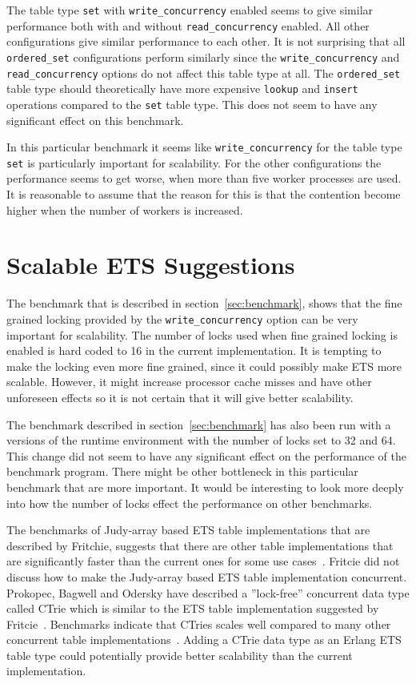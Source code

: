 \documentclass[aps,pre,preprint,nofootinbib]{revtex4}
\begin{document}
  The table type \verb|set| with \verb|write_concurrency| enabled seems to give similar performance both with and without \verb|read_concurrency| enabled.
  All other configurations give similar performance to each other.
  It is not surprising that all \verb|ordered_set| configurations perform similarly since the \verb|write_concurrency| and \verb|read_concurrency| options do not affect this table type at all.
  The \verb|ordered_set| table type should theoretically have more expensive \verb|lookup| and \verb|insert| operations compared to the \verb|set| table type.
  This does not seem to have any significant effect on this benchmark.
  
  In this particular benchmark it seems like \verb|write_concurrency| for the table type \verb|set| is particularly important for scalability.
  For the other configurations the performance seems to get worse, when more than five worker processes are used.
  It is reasonable to assume that the reason for this is that the contention become higher when the number of workers is increased.

  
  
\section{Scalable ETS Suggestions}

  The benchmark that is described in section~\ref{sec:benchmark}, shows that the fine grained locking provided by the \verb|write_concurrency| option can be very important for scalability.
  The number of locks used when fine grained locking is enabled is hard coded to 16 in the current implementation.
  It is tempting to make the locking even more fine grained, since it could possibly make ETS more scalable.
  However, it might increase processor cache misses and have other unforeseen effects so it is not certain that it will give better scalability. 
  
  The benchmark described in section~\ref{sec:benchmark} has also been run with a versions of the runtime environment with the number of locks set to 32 and 64.
  This change did not seem to have any significant effect on the performance of the benchmark program.
  There might be other bottleneck in this particular benchmark that are more important.
  It would be interesting to look more deeply into how the number of locks effect the performance on other benchmarks.
  
  The benchmarks of Judy-array based ETS table implementations that are described by Fritchie, suggests that there are other table implementations that are significantly faster than the current ones for some use cases~\cite{ScottEtsJudy}.
  Fritcie did not discuss how to make the Judy-array based ETS table implementation concurrent.
  Prokopec, Bagwell and Odersky have described a ''lock-free'' concurrent data type called CTrie which is similar to the ETS table implementation suggested by Fritcie~\cite{ProkopecCTrie}.
  Benchmarks indicate that CTries scales well compared to many other concurrent table implementations~\cite{ProkopecCTrie}.
  Adding a CTrie data type as an Erlang ETS table type could potentially provide better scalability than the current implementation.
  
\end{document}
